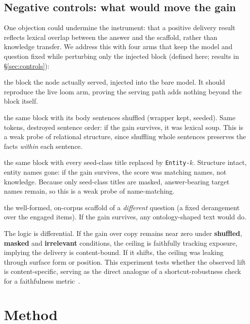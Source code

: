 \documentclass[10pt,twocolumn]{article}
\begin{document}
\subsection{Negative controls: what would move the gain}\label{sec:ceiling-controls}
One objection could undermine the instrument: that a positive delivery result reflects lexical overlap between the answer and the scaffold, rather than knowledge transfer. We address this with four arms that keep the model and question fixed while perturbing only the injected block (defined here; results in \S\ref{sec:controls}):
\begin{description}[topsep=2pt,itemsep=1pt,leftmargin=0pt,font=\normalfont\itshape]
\item[true] the block the node actually served, injected into the bare model. It should reproduce
the live loom arm, proving the serving path adds nothing beyond the block itself.
\item[shuffled] the same block with its body sentences shuffled (wrapper kept, seeded). Same tokens,
destroyed sentence order: if the gain survives, it was lexical soup. This is a weak probe of relational
structure, since shuffling whole sentences preserves the facts \emph{within} each sentence.
\item[masked] the same block with every seed-class title replaced by \texttt{Entity-$k$}. Structure
intact, entity names gone: if the gain survives, the score was matching names, not knowledge. Because
only seed-class titles are masked, answer-bearing target names remain, so this is a weak probe of
name-matching.
\item[irrelevant] the well-formed, on-corpus scaffold of a \emph{different} question (a fixed
derangement over the engaged items). If the gain survives, any ontology-shaped text would do.
\end{description}
The logic is differential. If the gain over copy remains near zero under \textbf{shuffled}, \textbf{masked} and \textbf{irrelevant} conditions, the ceiling is faithfully tracking exposure, implying the delivery is content-bound. If it shifts, the ceiling was leaking through surface form or position. This experiment tests whether the observed lift is content-specific, serving as the direct analogue of a shortcut-robustness check for a faithfulness metric~\cite{gao2023alce}.

\section{Method}\label{sec:method}
\end{document}
